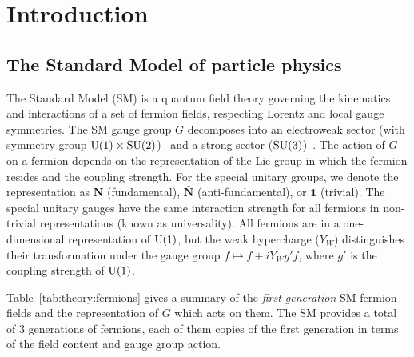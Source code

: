 \chapter{Introduction}
\label{sec:theory}

\section{The Standard Model of particle physics}

The Standard Model (SM) is a quantum field theory governing the kinematics and interactions of a set of fermion fields, respecting Lorentz and local gauge symmetries.
The SM gauge group $G$ decomposes into an electroweak sector (with symmetry group $\operatorname{\mathrm{U}}(1) \times \operatorname{\mathrm{SU}}(2)$)~\cite{weak1,weak2,weak3} and a strong sector ($\operatorname{\mathrm{SU}}(3)$)~\cite{qcd1,qcd2}.
The action of $G$ on a fermion depends on the representation of the Lie group in which the fermion resides and the coupling strength.
For the special unitary groups, we denote the representation as $\mathbf{N}$ (fundamental), $\bar{\mathbf{N}}$ (anti-fundamental), or $\mathbf{1}$ (trivial).
The special unitary gauges have the same interaction strength for all fermions in non-trivial representations (known as universality).
All fermions are in a one-dimensional representation of $\operatorname{\mathrm{U}}(1)$, but the weak hypercharge ($Y_W$) distinguishes their transformation under the gauge group $f\mapsto f + i Y_W g' f$, where $g'$ is the coupling strength of $\operatorname{\mathrm{U}}(1)$.

Table~\ref{tab:theory:fermions} gives a summary of the \emph{first generation} SM fermion fields and the representation of $G$ which acts on them.
The SM provides a total of 3 generations of fermions, each of them copies of the first generation in terms of the field content and gauge group action.

